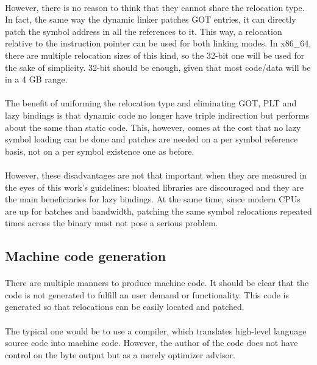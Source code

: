 \documentclass[12pt]{article}
\begin{document}
	\paragraph{}However, there is no reason to think that they cannot share the relocation type. In fact, the same way the dynamic linker patches GOT entries, it can directly patch the symbol address in all the references to it. This way, a relocation relative to the instruction pointer can be used for both linking modes. In x86\_64, there are multiple relocation sizes of this kind, so the 32-bit one will be used for the sake of simplicity. 32-bit should be enough, given that most code/data will be in a 4 GB range.
	\paragraph{}The benefit of uniforming the relocation type and eliminating GOT, PLT and lazy bindings is that dynamic code no longer have triple indirection but performs about the same than static code. This, however, comes at the cost that no lazy symbol loading can be done and patches are needed on a per symbol reference basis, not on a per symbol existence one as before.
	\paragraph{}However, these disadvantages are not that important when they are measured in the eyes of this work's guidelines: bloated libraries are discouraged and they are the main beneficiaries for lazy bindings. At the same time, since modern CPUs are up for batches and bandwidth, patching the same symbol relocations repeated times across the binary must not pose a serious problem.

	\subsection{Machine code generation}
	
	\paragraph{}There are multiple manners to produce machine code. It should be clear that the code is not generated to fulfill an user demand or functionality. This code is generated so that relocations can be easily located and patched.
	\paragraph{}The typical one would be to use a compiler, which translates high-level language source code into machine code. However, the author of the code does not have control on the byte output but as a merely optimizer advisor.
\end{document}
